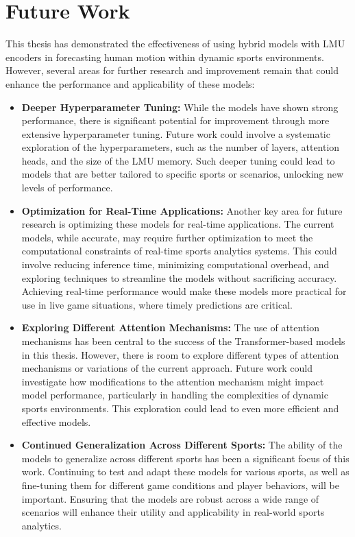 \chapter{Future Work}

This thesis has demonstrated the effectiveness of using hybrid models with LMU encoders in forecasting human motion within dynamic sports environments. However, several areas for further research and improvement remain that could enhance the performance and applicability of these models:

\begin{itemize}
    \item \textbf{Deeper Hyperparameter Tuning:} While the models have shown strong performance, there is significant potential for improvement through more extensive hyperparameter tuning. Future work could involve a systematic exploration of the hyperparameters, such as the number of layers, attention heads, and the size of the LMU memory. Such deeper tuning could lead to models that are better tailored to specific sports or scenarios, unlocking new levels of performance.

    \item \textbf{Optimization for Real-Time Applications:} Another key area for future research is optimizing these models for real-time applications. The current models, while accurate, may require further optimization to meet the computational constraints of real-time sports analytics systems. This could involve reducing inference time, minimizing computational overhead, and exploring techniques to streamline the models without sacrificing accuracy. Achieving real-time performance would make these models more practical for use in live game situations, where timely predictions are critical.

    \item \textbf{Exploring Different Attention Mechanisms:} The use of attention mechanisms has been central to the success of the Transformer-based models in this thesis. However, there is room to explore different types of attention mechanisms or variations of the current approach. Future work could investigate how modifications to the attention mechanism might impact model performance, particularly in handling the complexities of dynamic sports environments. This exploration could lead to even more efficient and effective models.

    \item \textbf{Continued Generalization Across Different Sports:} The ability of the models to generalize across different sports has been a significant focus of this work. Continuing to test and adapt these models for various sports, as well as fine-tuning them for different game conditions and player behaviors, will be important. Ensuring that the models are robust across a wide range of scenarios will enhance their utility and applicability in real-world sports analytics.


\end{itemize}
